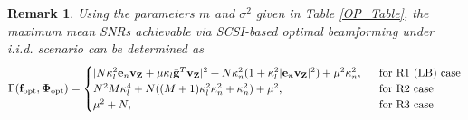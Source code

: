 \documentclass[journal,draftclsnofoot,onecolumn,12pt]{IEEEtran}
\newtheorem{remark}{Remark}
\begin{document}
\begin{remark}\label{remark2}
    Using the parameters $m$ and $\sigma^2$ given in Table \ref{OP_Table}, the maximum  mean SNRs achievable via SCSI-based optimal beamforming under {\rm i.i.d.} scenario can be determined as 
    \begin{align*}
       \Gamma(\mathbf{f}_{\rm opt},\mathbf{\Phi}_{\rm opt})= \begin{cases}
            | N \kappa_l^2 \mathbf{e}_n \mathbf{v_Z} + \mu \kappa_l \Bar{\mathbf{g}}^T \mathbf{v_Z}|^2 + N \kappa_n^2 (1 + \kappa_l^2 |\mathbf{e}_n \mathbf{v_Z}|^2) + \mu^2 \kappa_n^2, ~~&\text{for R1 (LB) case}\\
            N^2M\kappa_l^4+ N((M+1)\kappa_l^2\kappa_n^2 + \kappa_n^2)+\mu^2, ~~&\text{for R2 case}\\
            \mu^2+N, ~~&\text{for R3 case}
        \end{cases}%
    \end{align*}
    

\end{remark}
\end{document}
